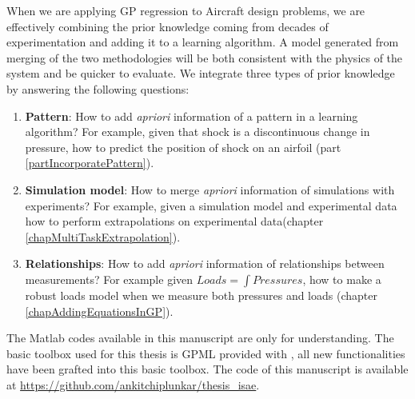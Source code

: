 When we are applying GP regression to Aircraft design problems, we are effectively combining the prior knowledge coming from decades of experimentation and adding it to a learning algorithm. A model generated from merging of the two methodologies will be both consistent with the physics of the system and be quicker to evaluate. We integrate three types of prior knowledge by answering the following questions:

\begin{enumerate}
\item \textbf{Pattern}: How to add \textit{apriori} information of a pattern in a learning algorithm? For example, given that shock is a discontinuous change in pressure, how to predict the position of shock on an airfoil (part \ref{partIncorporatePattern}). 
\item \textbf{Simulation model}: How to merge \textit{apriori} information of simulations with experiments? For example, given a simulation model and experimental data how to perform extrapolations on experimental data(chapter \ref{chapMultiTaskExtrapolation}). 
\item \textbf{Relationships}: How to add \textit{apriori} information of relationships between measurements? For example given $Loads = \int Pressures$, how to make a robust loads model when we measure both pressures and loads (chapter \ref{chapAddingEquationsInGP}).
\end{enumerate}

The Matlab codes available in this manuscript are only for understanding. The basic toolbox used for this thesis is GPML provided with \cite{Rasmussen2005}, all new functionalities have been grafted into this basic toolbox. The code of this manuscript is available at \url{https://github.com/ankitchiplunkar/thesis_isae}. 



